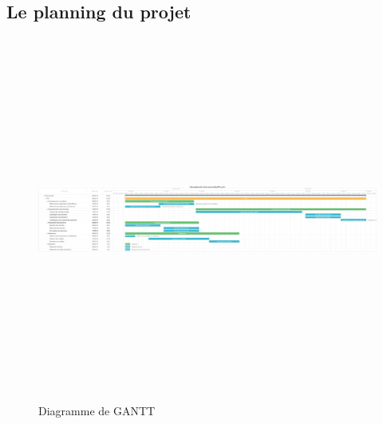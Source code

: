 	\begin{landscape}
	\subsection{Le planning du projet}
		\begin{figure}[H]
    			\centering
    			\includegraphics[width=26cm,height=12cm]{gantt.pdf}
    			\caption{Diagramme de GANTT}
    			\label{fig:gantt}
		\end{figure}
	\end{landscape}